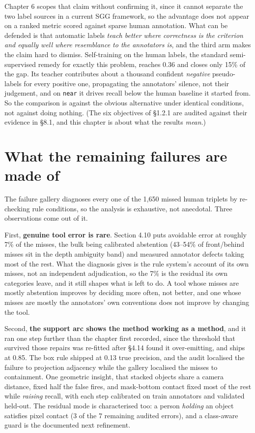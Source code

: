 Chapter 6 scopes that claim without confirming it, since it cannot separate the two label sources in a current SGG framework, so the advantage does not appear on a ranked metric scored against sparse human annotation. What can be defended is that automatic labels \textit{teach better where correctness is the criterion and equally well where resemblance to the annotators is}, and the third arm makes the claim hard to dismiss. Self-training on the human labels, the standard semi-supervised remedy for exactly this problem, reaches 0.36 and closes only 15\% of the gap. Its teacher contributes about a thousand confident \textit{negative} pseudo-labels for every positive one, propagating the annotators' silence, not their judgement, and on \texttt{near} it drives recall below the human baseline it started from. So the comparison is against the obvious alternative under identical conditions, not against doing nothing. (The six objectives of \S{}1.2.1 are audited against their evidence in \S{}8.1, and this chapter is about what the results \textit{mean}.)

\section{What the remaining failures are made of}

The failure gallery diagnoses every one of the 1,650 missed human triplets by re-checking rule conditions, so the analysis is exhaustive, not anecdotal. Three observations come out of it.

First, \textbf{genuine tool error is rare}. Section 4.10 puts avoidable error at roughly 7\% of the misses, the bulk being calibrated abstention (43--54\% of front/behind misses sit in the depth ambiguity band) and measured annotator defects taking most of the rest. What the diagnosis gives is the rule system's account of its own misses, not an independent adjudication, so the 7\% is the residual its own categories leave, and it still shapes what is left to do. A tool whose misses are mostly abstention improves by deciding more often, not better, and one whose misses are mostly the annotators' own conventions does not improve by changing the tool.

Second, \textbf{the support arc shows the method working as a method}, and it ran one step further than the chapter first recorded, since the threshold that survived those repairs was re-fitted after \S{}4.14 found it over-emitting, and ships at 0.85. The box rule shipped at 0.13 true precision, and the audit localised the failure to projection adjacency while the gallery localised the misses to containment. One geometric insight, that stacked objects share a camera distance, fixed half the false fires, and mask-bottom contact fixed most of the rest while \textit{raising} recall, with each step calibrated on train annotators and validated held-out. The residual mode is characterised too: a person \textit{holding} an object satisfies pixel contact (3 of the 7 remaining audited errors), and a class-aware guard is the documented next refinement.

